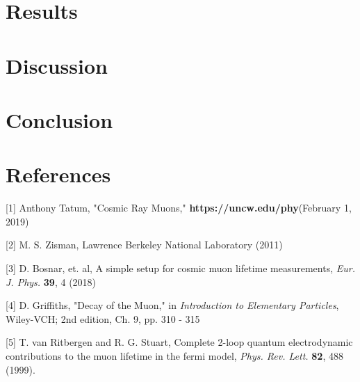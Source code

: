 \documentclass{article}
\begin{document}
\section*{Results}

\section*{Discussion}

\section*{Conclusion}

\section*{References}

\hspace{4mm} [1] \hspace{1mm}  Anthony Tatum, "Cosmic Ray Muons," \textbf{https://uncw.edu/phy}\newline (February 1, 2019)

\vspace{3mm}

[2] \hspace{1mm} M. S. Zisman, Lawrence Berkeley National Laboratory (2011)

\vspace{3 mm}



[3] \hspace{1mm}  D. Bosnar, et. al, A simple setup for cosmic muon lifetime measurements, \textit{Eur. J. Phys.} \textbf{39}, 4 (2018)
\vspace{3 mm}

[4] \hspace{1mm} D. Griffiths, "Decay of the Muon," in \textit{Introduction to Elementary Particles}, Wiley-VCH; 2nd edition, Ch. 9, pp. 310 - 315

\vspace{3 mm}

[5] \hspace{1mm} T. van Ritbergen and R. G. Stuart, Complete 2-loop quantum electrodynamic contributions to the muon lifetime in the fermi model, \textit{Phys. Rev. Lett.} \textbf{82}, 488 (1999).
\end{document}
